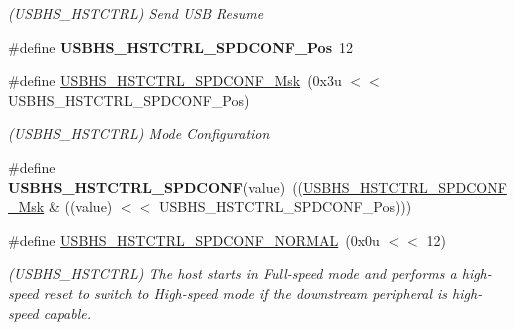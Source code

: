 \begin{DoxyCompactItemize}
\begin{DoxyCompactList}\small\item\em (U\+S\+B\+H\+S\+\_\+\+H\+S\+T\+C\+T\+RL) Send U\+SB Resume \end{DoxyCompactList}\item 
\mbox{\label{group__SAME70__USBHS_ga3dbc1f0e1a120ea37ac7e126e5048c18}} 
\#define {\bfseries U\+S\+B\+H\+S\+\_\+\+H\+S\+T\+C\+T\+R\+L\+\_\+\+S\+P\+D\+C\+O\+N\+F\+\_\+\+Pos}~12
\item 
\mbox{\label{group__SAME70__USBHS_gac7ec7fd901405a233ec5fc86a4c8cf33}} 
\#define \mbox{\hyperlink{group__SAME70__USBHS_gac7ec7fd901405a233ec5fc86a4c8cf33}{U\+S\+B\+H\+S\+\_\+\+H\+S\+T\+C\+T\+R\+L\+\_\+\+S\+P\+D\+C\+O\+N\+F\+\_\+\+Msk}}~(0x3u $<$$<$ U\+S\+B\+H\+S\+\_\+\+H\+S\+T\+C\+T\+R\+L\+\_\+\+S\+P\+D\+C\+O\+N\+F\+\_\+\+Pos)
\begin{DoxyCompactList}\small\item\em (U\+S\+B\+H\+S\+\_\+\+H\+S\+T\+C\+T\+RL) Mode Configuration \end{DoxyCompactList}\item 
\mbox{\label{group__SAME70__USBHS_gafa93266fe4a5db3f21621b544b3fcbf0}} 
\#define {\bfseries U\+S\+B\+H\+S\+\_\+\+H\+S\+T\+C\+T\+R\+L\+\_\+\+S\+P\+D\+C\+O\+NF}(value)~((\mbox{\hyperlink{group__SAMV71__USBHS_gac7ec7fd901405a233ec5fc86a4c8cf33}{U\+S\+B\+H\+S\+\_\+\+H\+S\+T\+C\+T\+R\+L\+\_\+\+S\+P\+D\+C\+O\+N\+F\+\_\+\+Msk}} \& ((value) $<$$<$ U\+S\+B\+H\+S\+\_\+\+H\+S\+T\+C\+T\+R\+L\+\_\+\+S\+P\+D\+C\+O\+N\+F\+\_\+\+Pos)))
\item 
\mbox{\label{group__SAME70__USBHS_ga64e316d861e4536eeef786752d54af55}} 
\#define \mbox{\hyperlink{group__SAME70__USBHS_ga64e316d861e4536eeef786752d54af55}{U\+S\+B\+H\+S\+\_\+\+H\+S\+T\+C\+T\+R\+L\+\_\+\+S\+P\+D\+C\+O\+N\+F\+\_\+\+N\+O\+R\+M\+AL}}~(0x0u $<$$<$ 12)
\begin{DoxyCompactList}\small\item\em (U\+S\+B\+H\+S\+\_\+\+H\+S\+T\+C\+T\+RL) The host starts in Full-\/speed mode and performs a high-\/speed reset to switch to High-\/speed mode if the downstream peripheral is high-\/speed capable. \end{DoxyCompactList}\item 
\mbox{\label{group__SAME70__USBHS_gadf2f66676fae0988982122a3832dda2a}} 
$$
\end{DoxyCompactItemize}
